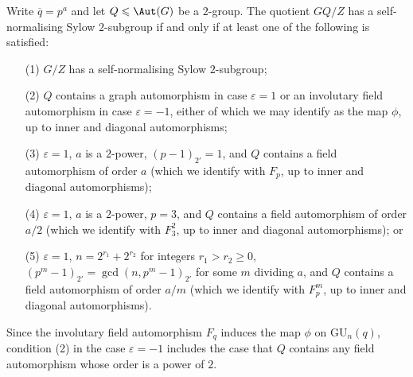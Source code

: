 \documentclass[eqthmnum, nocolour]{jt-calcs}
\newcommand{\GU}{\ensuremath{\mathrm{GU}}}
\renewcommand{\epsilon}{\varepsilon}
\begin{document}
\begin{lemma}\label{lem:whenSN2S}
Write $\overline{q}=p^a$ and let $Q \leqslant \Aut(G)$ be a $2$-group. The quotient $GQ/Z$ has a self-normalising Sylow $2$-subgroup if and only if at least one of the following is satisfied:
\begin{itemize}
	\item[(1)] $G/Z$ has a self-normalising Sylow $2$-subgroup; 
	\item[(2)] $Q$ contains a graph automorphism in case $\epsilon = 1$ or an involutary field automorphism in case $\epsilon=-1$, either of which we may identify as the map $\phi$, up to inner and diagonal automorphisms;
	\item[(3)] $\epsilon=1$, $a$ is a $2$-power,  $(p-1)_{2'}=1$, and $Q$ contains a field automorphism of order $a$ (which we identify with $F_{ p}$, up to inner and diagonal automorphisms);
	\item[(4)] $\epsilon=1$, $a$ is a $2$-power, $p=3$, and $Q$ contains a field automorphism of order $a/2$ (which we identify with $F_3^2$, up to inner and diagonal automorphisms); or
	\item[(5)] $\epsilon=1$, $n=2^{r_1}+2^{r_2}$ for integers $r_1>r_2\geq 0$, $(p^m-1)_{2'}=\gcd(n,p^m-1)_{2'}$ for some $m$ dividing $a$, and $Q$ contains a field automorphism of order $a/m$ (which we identify with $F_{ p}^m$, up to inner and diagonal automorphisms).
\end{itemize}
\end{lemma}

\begin{rem}
Since the involutary field automorphism $F_q$ induces the map $\phi$ on $\GU_n(q)$, condition (2) in the case $\epsilon=-1$ includes the case that $Q$ contains any field automorphism whose order is a power of $2$.
\end{rem}
\end{document}
